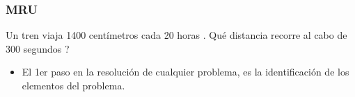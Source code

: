 \documentclass{beamer}
\begin{document}
\begin{frame}
\frametitle{MRU}
% 
 
Un{{ tren}} viaja 1400 centímetros cada 20 horas .
Qué distancia recorre al cabo de 300 segundos ?                                                     
                                                              
 
\begin{itemize}                                                              

\item El 1er paso en la resoluci\'on de cualquier problema, es la
identificaci\'on de los elementos del problema.            
              
\end{itemize}                                                 
 
 
\scalebox{1} %
{
}

\end{frame}
\end{document}
